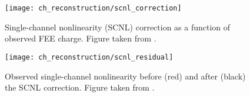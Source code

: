 \begin{figure}
    \centering
    \texttt{[image: ch\_reconstruction/scnl\_correction]}
    \caption[SCNL: final correction curve]{
        Single-channel nonlinearity (SCNL) correction
        as a function of observed FEE charge.
        Figure taken from \cite{scnl_technote}.
    }
    \label{fig:scnl_correction}
\end{figure}

\begin{figure}
    \centering
    \texttt{[image: ch\_reconstruction/scnl\_residual]}
    \caption[SCNL: residual nonlinearity]{
        Observed single-channel nonlinearity before (red) and after (black)
        the SCNL correction.
        Figure taken from \cite{scnl_technote}.
    }
    \label{fig:scnl_residual}
\end{figure}
